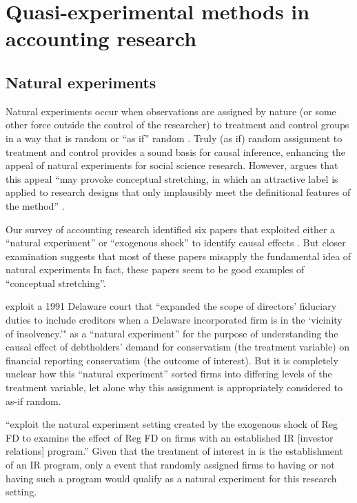 \documentclass[11pt]{amsart}
\begin{document}
\section{Quasi-experimental methods in accounting research}


\subsection{Natural experiments}
Natural experiments occur when observations are assigned by nature (or some other force outside the control of the researcher) to treatment and control groups in a way that is random or ``as if'' random \citep{Dunning:2012tt}. 
Truly (as if) random assignment to treatment and control provides a sound basis for causal inference, enhancing the appeal of natural experiments for social science research.
However, argues that this appeal ``may provoke conceptual stretching, in which an attractive label is applied to research designs that only implausibly meet the definitional features of the method'' \citep[p.3]{Dunning:2012tt}.

Our survey of accounting research identified six papers that exploited either a ``natural experiment'' or ``exogenous shock'' to identify causal effects \citep{Lo:2013jk,Aier:2014ii,Kirk:2014gx,Houston:2014hv}. %
But closer examination suggests that most of these papers misapply the fundamental idea of natural experiments  In fact, these papers seem to be good examples of ``conceptual stretching''.

\cite{Aier:2014ii} exploit a 1991 Delaware court that ``expanded the scope of directors' fiduciary duties to include creditors when a Delaware incorporated firm is in the `vicinity of insolvency.'" as a ``natural experiment'' for the purpose of understanding the causal effect of debtholders' demand for conservatism (the treatment variable) on financial reporting conservatism (the outcome of interest). But it is completely unclear how this ``natural experiment'' sorted firms into differing levels of the treatment variable, let alone why this assignment is appropriately considered to as-if random.

\citet{Kirk:2014gx} ``exploit the natural experiment setting created by the exogenous shock of Reg FD to examine the effect of Reg FD on firms with an established IR [investor relations] program.'' 
Given that the treatment of interest in \citet{Kirk:2014gx} is the establishment of an IR program, only a event that randomly assigned firms to having or not having such a program would qualify as a natural experiment for this research setting.
\end{document}
